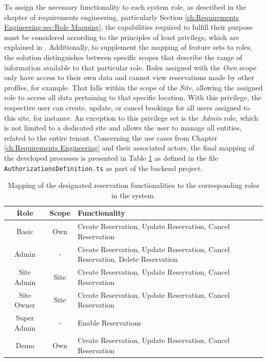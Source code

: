 To assign the necessary functionality to each system role, as described in the chapter of requirements engineering, particularly Section \ref{ch:Requirements Engineering:sec:Role Mapping}, the capabilities required to fulfill their purpose must be considered according to the principles of least privilege, which are explained in \cite{ma_specifying_2011}.
Additionally, to supplement the mapping of feature sets to roles, the solution distinguishes between specific scopes that describe the range of information available to that particular role.
Roles assigned with the \textit{Own} scope only have access to their own data and cannot view reservations made by other profiles, for example.
That falls within the scope of the \textit{Site}, allowing the assigned role to access all data pertaining to that specific location.
With this privilege, the respective user can create, update, or cancel bookings for all users assigned to this site, for instance. An exception to this privilege set is the \textit{Admin} role, which is not limited to a dedicated site and allows the user to manage all entities, related to the entire tenant. 
Concerning the use cases from Chapter \ref{ch:Requirements Engineering} and their associated actors, the final mapping of the developed processes is presented in Table \ref{tab:role-function-mapping} as defined in the file \texttt{AuthorizationsDefinition.ts} as part of the backend project.

\begingroup
\setlength{\tabcolsep}{10pt} %
\renewcommand{\arraystretch}{1.5} %
\begin{table}[h]
    \centering
    \caption{Mapping of the designated reservation functionalities to the corresponding roles in the system.}
    \begin{tabular}{c|c|m{9.5cm}}
        Role & Scope & Functionality \\
        \hline
        Basic & Own & Create Reservation, Update Reservation, Cancel Reservation \\
        Admin & - & Create Reservation, Update Reservation, Cancel Reservation, Delete Reservation \\
        Site Admin & Site & Create Reservation, Update Reservation, Cancel Reservation \\
        Site Owner & Site & Create Reservation, Update Reservation, Cancel Reservation \\
        Super Admin & - & Enable Reservations \\
        Demo & Own & Create Reservation, Update Reservation, Cancel Reservation \\
    \end{tabular}
    \label{tab:role-function-mapping}
\end{table}
\endgroup

